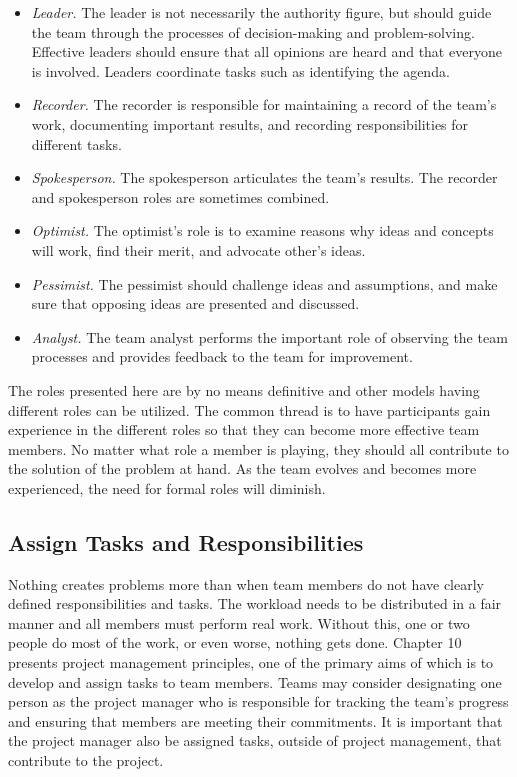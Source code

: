 \begin{itemize}
\item
  \emph{Leader.} The leader is not necessarily the authority figure, but
  should guide the team through the processes of decision-making and
  problem-solving. Effective leaders should ensure that all opinions are
  heard and that everyone is involved. Leaders coordinate tasks such as
  identifying the agenda.
\item
  \emph{Recorder.} The recorder is responsible for maintaining a record
  of the team's work, documenting important results, and recording
  responsibilities for different tasks.
\item
  \emph{Spokesperson.} The spokesperson articulates the team's results.
  The recorder and spokesperson roles are sometimes combined.
\item
  \emph{Optimist.} The optimist's role is to examine reasons why ideas
  and concepts will work, find their merit, and advocate other's ideas.
\item
  \emph{Pessimist.} The pessimist should challenge ideas and
  assumptions, and make sure that opposing ideas are presented and
  discussed.
\item
  \emph{Analyst.} The team analyst performs the important role of
  observing the team processes and provides feedback to the team for
  improvement.
\end{itemize}

The roles presented here are by no means definitive and other models
having different roles can be utilized. The common thread is to have
participants gain experience in the different roles so that they can
become more effective team members. No matter what role a member is
playing, they should all contribute to the solution of the problem at
hand. As the team evolves and becomes more experienced, the need for
formal roles will diminish.

\subsection{Assign Tasks and Responsibilities}
\label{subsection:assign-tasks-and-responsibilities}

Nothing creates problems more than when team members do not have clearly
defined responsibilities and tasks. The workload needs to be distributed
in a fair manner and all members must perform real work. Without this,
one or two people do most of the work, or even worse, nothing gets done.
Chapter 10 presents project management principles, one of the primary
aims of which is to develop and assign tasks to team members. Teams may
consider designating one person as the project manager who is
responsible for tracking the team's progress and ensuring that members
are meeting their commitments. It is important that the project manager
also be assigned tasks, outside of project management, that contribute
to the project.

